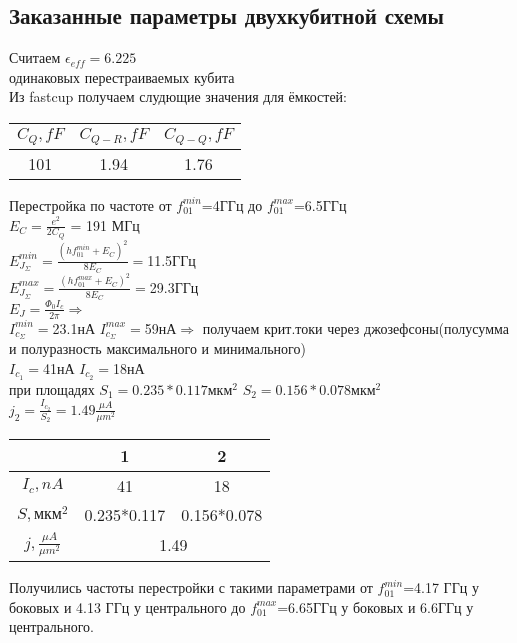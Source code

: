 \documentclass[12pt, a4paper, openany]{book}
\begin{document}
\subsection{Заказанные параметры двухкубитной схемы}
\noindent Считаем $\epsilon_{eff}=6.225$\\
 одинаковых перестраиваемых кубита\\
\noindent Из fastcup получаем слудющие значения для ёмкостей:
	\begin{center}
		\begin{tabular}{ | c | c | c | }
   		 	\hline
   			$C_Q,fF$ & $ C_{Q-R},fF$ &$ C_{Q-Q},fF$ \\ \hline
   		 	101 & 1.94 & 1.76 \\ \hline
		\end{tabular}
	\end{center}
\noindent Перестройка по частоте от $f_{01}^{min}$=4ГГц до $f_{01}^{max}$=6.5ГГц\\
$E_{C}=\frac{e^2}{2C_Q}$ = 191 МГц\\
$E_{J_{\Sigma}}^{min} = \frac{(hf_{01}^{min}+E_{C})^2}{8E_{C}}=$11.5ГГц \\
$E_{J_{\Sigma}}^{max} = \frac{(hf_{01}^{max}+E_{C})^2}{8E_{C}}=$29.3ГГц \\
$E_{J}=\frac{\Phi_0 I_c}{2\pi}\Rightarrow$ \\
$I_{c_{\Sigma}}^{min}=$23.1нА $I_{c_{\Sigma}}^{max}=$59нА$\Rightarrow$
получаем крит.токи через джозефсоны(полусумма и полуразность максимального и минимального)\\
$I_{c_{1}}=$41нА $I_{c_{2}}=$18нА\\
при площадях $S_1 = 0.235*0.117 \text{мкм}^2$  $S_2 = 0.156*0.078\text{мкм}^2$  \\
$j_2=\frac{I_{c_{2}}}{S_2}=1.49\frac{\mu A}{{\mu m}^2}$
	\begin{center}
		\begin{tabular}{ | c | c | c |}
   		 	\hline
   			  &1 &2 \\ \hline
    			 $I_c,nA$ & 41 & 18 \\ \hline
    	 		$S,{\text{мкм}}^2$ & 0.235*0.117 & 0.156*0.078  \\ \hline
    	 		 $j,\frac{\mu A}{{\mu m}^2}$  &\multicolumn{2}{|c|}{1.49}\\ \hline
		\end{tabular}
	\end{center}
	
Получились частоты перестройки с такими параметрами 
от $f_{01}^{min}$=4.17 ГГц у боковых и 4.13 ГГц у центрального до $f_{01}^{max}$=6.65ГГц у боковых и 6.6ГГц у центрального.
\end{document}
